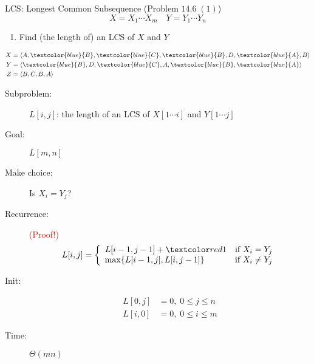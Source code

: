 
\begin{frame}{}
  \centerline{}
\end{frame}

\begin{frame}{}
  \begin{exampleblock}{LCS: Longest Common Subsequence (Problem $14.6\; (1)$)}
    \[
      X = X_{1} \cdots X_{m} \quad Y = Y_{1} \cdots Y_{n}
    \]

    \begin{enumerate}[(1)]
      \item Find (the length of) an LCS of $X$ and $Y$
    \end{enumerate}
  \end{exampleblock}

  \begin{align*}
    X &= \langle A,\textcolor{blue}{B},\textcolor{blue}{C},\textcolor{blue}{B},D,\textcolor{blue}{A},B \rangle  \\
    Y &= \langle \textcolor{blue}{B},D,\textcolor{blue}{C},A,\textcolor{blue}{B},\textcolor{blue}{A} \rangle \\
    Z &= \langle B,C,B,A \rangle
  \end{align*}
\end{frame}
\begin{frame}{}
  \begin{description}
    \item[Subproblem:] $L[i,j]$: the length of an LCS of $X[1 \cdots i]$ and $Y[1 \cdots j]$
    \item[Goal:] $L[m,n]$
      \pause
    \item[Make choice:] Is $X_{i} = Y_{j}$?
    \item[Recurrence:] \textcolor{red}{(Proof!)}
      \begin{displaymath}
	L[i,j] = \left\{ \begin{array}{ll}
	  L[i-1, j-1] + \red{1} & \textrm{if $X_{i} = Y_{j}$}\\
	  \max \set{L[i-1,j], L[i,j-1]} & \textrm{if $X_{i} \neq Y_{j}$}
	\end{array} \right.
      \end{displaymath}
      \pause
    \item[Init:]
      \begin{align*}
	L[0,j] &= 0, \; 0 \le j \le n \\
	L[i,0] &= 0, \; 0 \le i \le m 
      \end{align*}
    \item[Time:] $\Theta(mn)$
  \end{description}
\end{frame}

